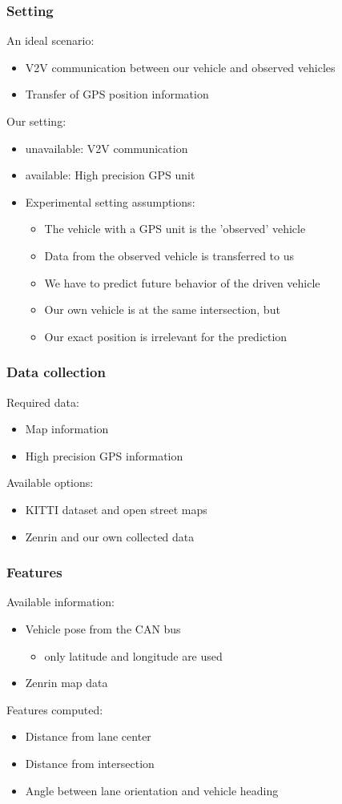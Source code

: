 \documentclass{beamer}
\begin{document}
\begin{frame}
\frametitle{Setting}
An ideal scenario:
\begin{itemize}
  \item V2V communication between our vehicle and observed vehicles
  \item Transfer of GPS position information
\end{itemize}
Our setting:
\begin{itemize}
  \item unavailable: V2V communication
  \item available: High precision GPS unit
  \item Experimental setting assumptions:
  \begin{itemize}
    \item The vehicle with a GPS unit is the 'observed' vehicle
    \item Data from the observed vehicle is transferred to us
    \item We have to predict future behavior of the driven vehicle
   	\item Our own vehicle is at the same intersection, but
   	\item Our exact position is irrelevant for the prediction
   \end{itemize}
\end{itemize}
\end{frame}

\begin{frame}
\frametitle{Data collection}
	Required data:
	\begin{itemize}
	\item Map information
	\item High precision GPS information
	\end{itemize}
	Available options:
	\begin{itemize}
	   \item KITTI dataset and open street maps
	   \item Zenrin and our own collected data 
	\end{itemize}
\end{frame}


\begin{frame}
\frametitle{Features}
	Available information:
	\begin{itemize}
	\item Vehicle pose from the CAN bus
	\begin{itemize}\item only latitude and longitude are used \end{itemize}
	\item Zenrin map data
	\end{itemize}
	Features computed:
	\begin{itemize}
	   \item Distance from lane center
	   \item Distance from intersection
	   \item Angle between lane orientation and vehicle heading
	\end{itemize}
\end{frame}
\end{document}
